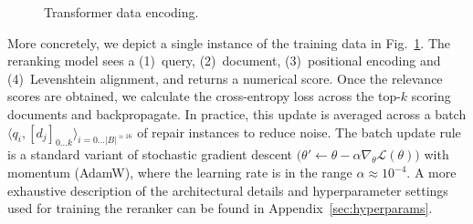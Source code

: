 \documentclass[popl.tex]{subfiles}
\begin{document}
\begin{figure}
\caption{Transformer data encoding.}\label{fig:tx_data_encoding}
\end{figure}

More concretely, we depict a single instance of the training data in Fig.~\ref{fig:tx_data_encoding}. The reranking model sees a (1)~query, (2)~document, (3)~positional encoding and (4)~Levenshtein alignment, and returns a numerical score. Once the relevance scores are obtained, we calculate the cross-entropy loss across the top-$k$ scoring documents and backpropagate. In practice, this update is averaged across a batch $\langle q_i, [d_j]_{0\ldots k}\rangle_{i=0\ldots |B|^{\approx 16}}$ of repair instances to reduce noise. The batch update rule is a standard variant of stochastic gradient descent $\big(\theta' \leftarrow \theta - \alpha \nabla_{\theta} \mathcal{L}(\theta)\big)$ with momentum (AdamW), where the learning rate is in the range $\alpha\approx10^{-4}$. A more exhaustive description of the architectural details and hyperparameter settings used for training the reranker can be found in Appendix~\ref{sec:hyperparams}.\clearpage
\ifSubfilesClassLoaded{\par\clearpage}{}
\end{document}
